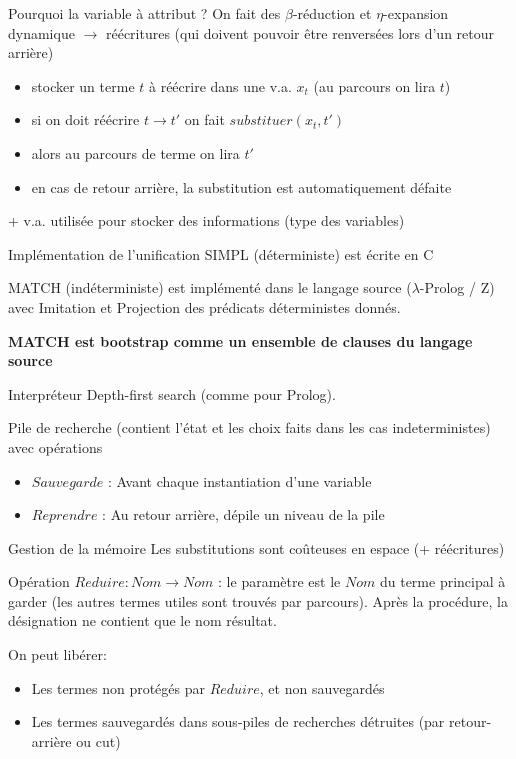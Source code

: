 \documentclass[aspectratio=169]{beamer}
\begin{document}
\begin{frame}{Pourquoi la variable à attribut ?}
  On fait des $\beta$-réduction et $\eta$-expansion dynamique $\rightarrow$ réécritures (qui doivent pouvoir être renversées lors d'un retour arrière)

  \begin{itemize}
    \item stocker un terme $t$ à réécrire dans une v.a. $x_t$ (au parcours on lira $t$)
    \item si on doit réécrire $t \rightarrow t'$ on fait $substituer(x_t, t')$
    \item alors au parcours de terme on lira $t'$
    \item en cas de retour arrière, la substitution est automatiquement défaite
  \end{itemize}

  + v.a. utilisée pour stocker des informations (type des variables)
\end{frame}

\begin{frame}{Implémentation de l'unification}
  SIMPL (déterministe) est écrite en C

  MATCH (indéterministe) est implémenté dans le langage source ($\lambda$-Prolog / Z) avec Imitation et Projection des prédicats déterministes donnés.

  \textbf{MATCH est bootstrap comme un ensemble de clauses du langage source}
\end{frame}

\begin{frame}{Interpréteur}
  Depth-first search (comme pour Prolog).

  Pile de recherche (contient l'état et les choix faits dans les cas indeterministes) avec opérations
  \begin{itemize}
    \item $Sauvegarde$ : Avant chaque instantiation d'une variable
    \item $Reprendre$ : Au retour arrière, dépile un niveau de la pile
  \end{itemize}
\end{frame}

\begin{frame}{Gestion de la mémoire}
  Les substitutions sont coûteuses en espace (+ réécritures)

  Opération $Reduire : Nom \rightarrow Nom$ : le paramètre est le $Nom$ du terme principal à garder (les autres termes utiles sont trouvés par parcours). Après la procédure, la désignation ne contient que le nom résultat.

  On peut libérer:
  \begin{itemize}
    \item Les termes non protégés par $Reduire$, et non sauvegardés
    \item Les termes sauvegardés dans sous-piles de recherches détruites (par retour-arrière ou cut)
  \end{itemize}
\end{frame}
\end{document}
